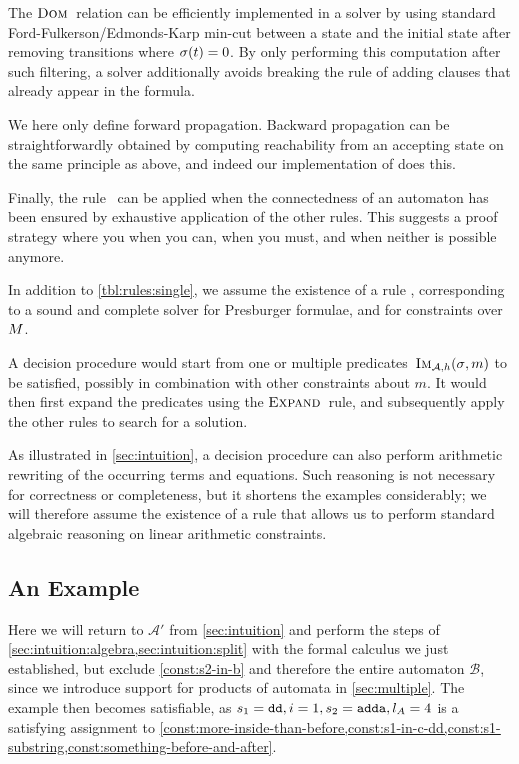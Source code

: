 The $\operatorname{\textsc{Dom}}$~relation can be efficiently implemented in a solver
by using standard Ford-Fulkerson\slash{}Edmonds-Karp min-cut between a state
and the initial state after removing transitions where $\operatorname{\sigma}(t) = 0$.
By only performing this computation after such filtering, a solver additionally avoids
breaking the rule of adding clauses that already appear in the formula.

We here only define forward propagation. Backward propagation 
can be straightforwardly obtained by computing reachability from
an accepting state on the same principle as above, and indeed our
implementation of \Calculus{} does this.

Finally, the rule~\Subsume{} can be applied when the connectedness of
an automaton has been ensured by exhaustive application of the other
rules. This suggests a proof strategy where you \Propagate{} when you
can, \Split{} when you must, and \Subsume{} when neither is possible
anymore.

In addition to \cref{tbl:rules:single}, we assume the existence of a rule
\PresburgerClose{}, corresponding to a sound and complete solver for Presburger
formulae, and for constraints over~$M$.

A decision procedure would start from one or multiple
predicates~$\operatorname{\textsc{Im}}_{\mathcal{A}, h}(\operatorname{\sigma}, m)$ to be satisfied, possibly in
combination with other constraints about $m$. It would then first
expand the predicates using the $\textsc{Expand}{}$~rule, and subsequently
apply the other rules to search for a solution.

As illustrated in \cref{sec:intuition}, a decision procedure can
also perform arithmetic rewriting of the occurring terms and
equations. Such reasoning is not necessary for correctness or
completeness, but it shortens the examples considerably; we
will therefore assume the existence of a
rule \EquationReasoning{} that allows us to perform standard algebraic reasoning
on linear arithmetic constraints. 


\subsection{An Example}\label{sec:single:example}
Here we will return to $\mathcal{A}'$ from \cref{sec:intuition} and perform the steps of
\cref{sec:intuition:algebra,sec:intuition:split} with the
formal calculus we just established, but exclude \cref{const:s2-in-b} and
therefore the entire automaton $\mathcal{B}$, since we introduce support for products of
automata in \cref{sec:multiple}. The example then becomes
satisfiable, as $s_1 = \texttt{dd}, i = 1, s_2 = \texttt{adda}, l_A = 4$ is a
satisfying assignment to
\cref{const:more-inside-than-before,const:s1-in-c-dd,const:s1-substring,const:something-before-and-after}.

